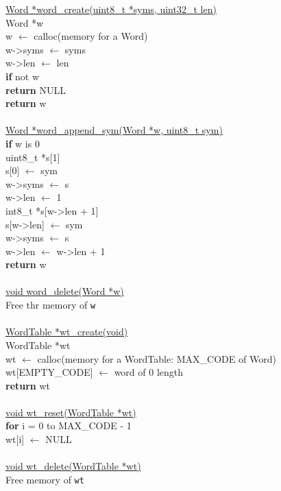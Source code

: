 \documentclass[12pt]{article}
\begin{document}
\underline{Word *word\_create(uint8\_t *syms, uint32\_t len)} \\
\indent Word *w \\
\indent w $\leftarrow$ calloc(memory for a Word) \\
\indent w->syms $\leftarrow$ syms \\
\indent w->len $\leftarrow$ len \\
\indent \textbf{if} not w \\
\indent \indent \textbf{return} NULL \\
\indent \textbf{return} w \\
\\
\underline{Word *word\_append\_sym(Word *w, uint8\_t sym)} \\
\indent \textbf{if} w is 0 \\
\indent \indent uint8\_t *s[1] \\
\indent \indent s[0] $\leftarrow$ sym \\
\indent \indent w->syms $\leftarrow$ s \\
\indent \indent w->len $\leftarrow$ 1 \\
\indent int8\_t *s[w->len + 1] \\
\indent s[w->len] $\leftarrow$ sym \\
\indent w->syms $\leftarrow$ s \\
\indent w->len $\leftarrow$ w->len + 1 \\
\indent \textbf{return} w \\
\\
\underline{void word\_delete(Word *w)} \\
\indent Free thr memory of \texttt{w} \\
\\
\underline{WordTable *wt\_create(void)} \\
\indent WordTable *wt \\
\indent wt $\leftarrow$ calloc(memory for a WordTable: MAX\_CODE of Word) \\
\indent wt[EMPTY\_CODE] $\leftarrow$ word of 0 length \\
\indent \textbf{return} wt \\
\\
\underline{void wt\_reset(WordTable *wt)} \\
\indent \textbf{for} i = 0 to MAX\_CODE - 1 \\
\indent \indent wt[i] $\leftarrow$ NULL \\
\\
\underline{void wt\_delete(WordTable *wt)} \\
Free memory of \texttt{wt} \\
\\
\end{document}
